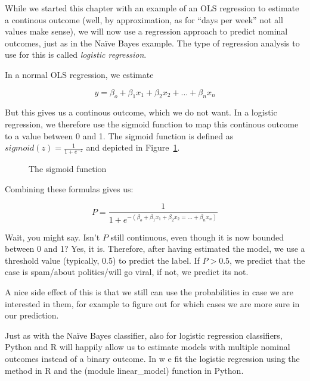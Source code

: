 While we started this chapter with an example of an OLS regression to
estimate a continous outcome (well, by approximation, as for ``days
per week'' not all values make sense), we will now use a regression
approach to predict nominal outcomes, just as in the Na\"ive Bayes
example.  The type of regression analysis to use for this is called
\emph{logistic regression}.

In a normal OLS regression, we estimate

$$y = \beta_o + \beta_1 x_1 + \beta_2 x_2 + \ldots + \beta_n x_n$$

But this gives us a continous outcome, which we do not want. In a
logistic regression, we therefore use the sigmoid function to map this
continous outcome to a value between 0 and 1. The sigmoid function is
defined as $sigmoid(z) = \frac{1}{1 + e^{-z}}$ and depicted in
Figure~\ref{fig:sigmoid}.

\begin{figure}
  \centering
{}
\caption{\label{fig:sigmoid} The sigmoid function}
\end{figure}


Combining these formulas gives us:

$$P = \frac{1}{1 + e^{-(\beta_o + \beta_1 x_1 + \beta_2 x_2 = \ldots + \beta_n x_n)}} $$


Wait, you might say. Isn't $P$ still continuous, even though it is now
bounded between 0 and 1? Yes, it is.  Therefore, after having
estimated the model, we use a threshold value (typically, 0.5) to
predict the label. If $P>0.5$, we predict that the case is spam/about
politics/will go viral, if not, we predict its not.

A nice side effect of this is that we still can use the probabilities
in case we are interested in them, for example to figure out for which
cases we are more sure in our prediction.

Just as with the Na\"ive Bayes classifier, also for logistic
regression classifiers, Python and R will happily allow us to estimate
models with multiple nominal outcomes instead of a binary outcome. In  w	e fit the logistic regression using the  method  in R and the  (module linear\_model) function  in Python.

